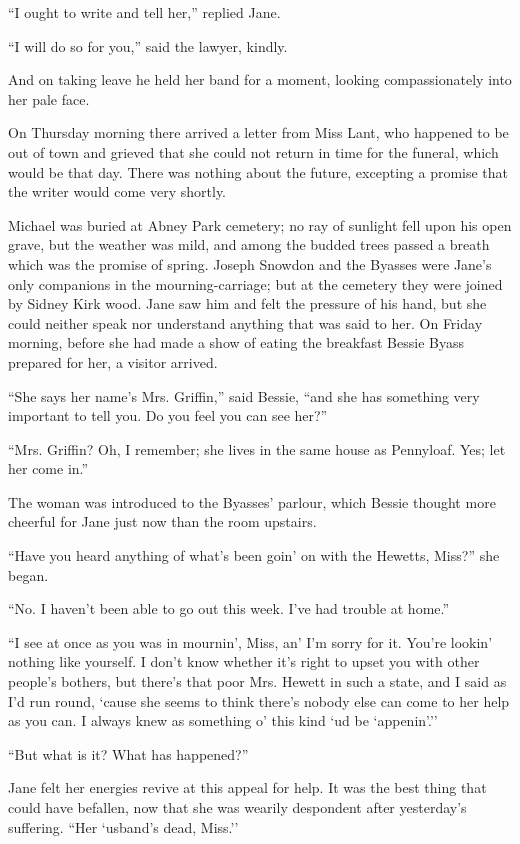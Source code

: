 ``I ought to write and tell her,'' replied Jane.

``I will do so for you,'' said the lawyer, kindly.

And on taking leave he held her band for a moment, looking
compassionately into her pale face.

On Thursday morning there arrived a letter from Miss Lant, who happened
to be out of town and grieved that she could not return in time for the
funeral, which would be that day. There was nothing about the future,
excepting a promise that the writer would come very shortly.

Michael was buried at Abney Park {}cemetery; no ray of sunlight fell
upon his open grave, but the weather was mild, and among the budded
trees passed a breath which was the promise of spring. Joseph Snowdon
and the Byasses were Jane's only companions in the mourning-carriage;
but at the cemetery they were joined by Sidney Kirk wood. Jane saw him
and felt the pressure of his hand, but she could neither speak nor
understand anything that was said to her. On Friday morning, before she
had made a show of eating the breakfast Bessie Byass prepared for her, a
visitor arrived.

``She says her name's Mrs. Griffin,'' said Bessie, ``and she has
something very important to tell you. Do you feel you can see her?''

``Mrs. Griffin? Oh, I remember; she lives in the same house as
Pennyloaf. Yes; let her come in.''

The woman was introduced to the Byasses' parlour, which Bessie thought
more cheerful for Jane just now than the room upstairs.

``Have you heard anything of what's been goin' on with the Hewetts,
Miss?'' she began.

``No. I haven't been able to go out this week. I've had trouble at
home.''

{}``I see at once as you was in mournin', Miss, an' I'm sorry for it.
You're lookin' nothing like yourself. I don't know whether it's right to
upset you with other people's bothers, but there's that poor Mrs. Hewett
in such a state, and I said as I'd run round, `cause she seems to think
there's nobody else can come to her help as you can. I always knew as
something o' this kind `ud be `appenin'.''

``But what is it? What has happened?''

Jane felt her energies revive at this appeal for help. It was the best
thing that could have befallen, now that she was wearily despondent
after yesterday's suffering. ``Her `usband's dead, Miss.''

